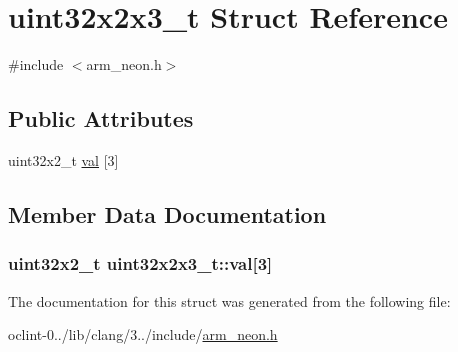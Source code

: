 \hypertarget{structuint32x2x3__t}{\section{uint32x2x3\-\_\-t Struct Reference}
\label{structuint32x2x3__t}
}


{\ttfamily \#include $<$arm\-\_\-neon.\-h$>$}

\subsection*{Public Attributes}
\begin{DoxyCompactItemize}
\item 
uint32x2\-\_\-t \hyperlink{structuint32x2x3__t_a83ac1a1428dcf13108e829da17b8d202}{val} \mbox{[}3\mbox{]}
\end{DoxyCompactItemize}


\subsection{Member Data Documentation}
\hypertarget{structuint32x2x3__t_a83ac1a1428dcf13108e829da17b8d202}{
\subsubsection[{val}]{\setlength{\rightskip}{0pt plus 5cm}uint32x2\-\_\-t uint32x2x3\-\_\-t\-::val\mbox{[}3\mbox{]}}}\label{structuint32x2x3__t_a83ac1a1428dcf13108e829da17b8d202}


The documentation for this struct was generated from the following file\-:\begin{DoxyCompactItemize}
\item 
oclint-\/0../lib/clang/3../include/\hyperlink{arm__neon_8h}{arm\-\_\-neon.\-h}\end{DoxyCompactItemize}

